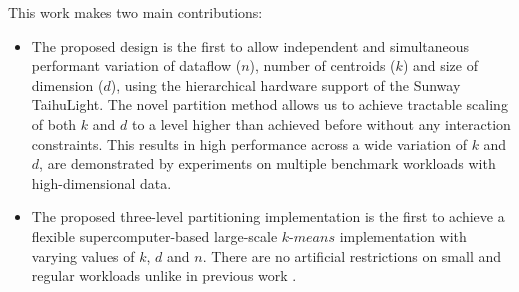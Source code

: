 This work makes two main contributions:

\begin{itemize}

\item The proposed design is the first to allow independent and simultaneous performant  variation of dataflow ($n$), number of centroids ($k$) and size of dimension ($d$), using the hierarchical hardware support of the Sunway TaihuLight. The novel partition method allows us to achieve tractable scaling of both $k$ and $d$ to a level higher than achieved before without any interaction constraints. This results in high performance across a wide variation of $k$ and $d$,  are demonstrated by experiments on multiple benchmark workloads with high-dimensional data. 




\item The proposed three-level partitioning implementation is the first to achieve a flexible supercomputer-based large-scale $k$-$means$ implementation with varying values of $k$, $d$ and $n$. There are no artificial restrictions on small and regular workloads unlike in previous work \cite{bender2015k}.


\end{itemize}
